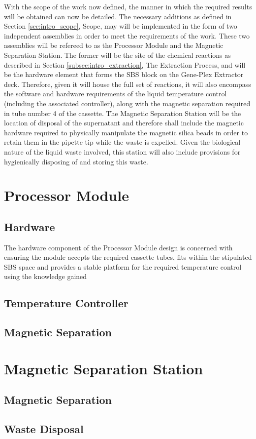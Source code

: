 With the scope of the work now defined, the manner in which the required results will be obtained can now be detailed. The necessary additions as defined in Section \ref*{sec:intro_scope}, Scope, may will be implemented in the form of two independent assemblies in order to meet the requirements of the work. These two assemblies will be refereed to as the Processor Module and the Magnetic Separation Station. The former will be the site of the chemical reactions as described in Section \ref{subsec:intro_extraction}, The Extraction Process, and will be the hardware element that forms the SBS block on the Gene-Plex Extractor deck. Therefore, given it will house the full set of reactions, it will also encompass the software and hardware requirements of the liquid temperature control (including the associated controller), along with the magnetic separation required in tube number 4 of the cassette. The Magnetic Separation Station will be the location of disposal of the supernatant and therefore shall include the magnetic hardware required to physically manipulate the magnetic silica beads in order to retain them in the pipette tip while the waste is expelled. Given the biological nature of the liquid waste involved, this station will also include provisions for hygienically disposing of and storing this waste.

\section{Processor Module}

\subsection{Hardware}

The hardware component of the Processor Module design is concerned with ensuring the module accepts the required cassette tubes, fits within the stipulated SBS space and provides a stable platform for the required temperature control using the knowledge gained 

\subsection{Temperature Controller}

\subsection{Magnetic Separation}

\section{Magnetic Separation Station}

\subsection{Magnetic Separation}

\subsection{Waste Disposal}